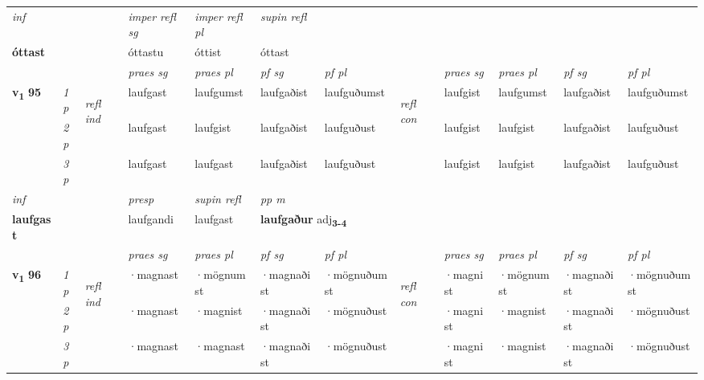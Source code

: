 \begin{longtable}[l]{X>{\footnotesize\itshape}llXXXXlXXXX}
   {\textit{inf}} & &   & \textit{imper refl sg} & \textit{imper refl pl}   & \textit{supin refl}  \\*
  {\textbf{óttast}} & &   & óttastu & óttist   & óttast  \\*

\midrule

 & &   & \textit{praes sg}  & \textit{praes pl}    & \textit{ pf sg} & \textit{pf pl} & & \textit{praes sg}  & \textit{praes pl}    & \textit{pf sg} & \textit{pf pl }  \\ \cmidrule{4-7} \cmidrule{9-12}
 \multirow{2}{*}{{{\textbf{v{\textsubscript{1}}} \Large{\textbf{95}}}}}  & 1p & \multirow{3}{*}{\begin{turn}{90}\textit{refl ind}\end{turn}}  & laufgast & laufgumst & laufgaðist & laufguðumst & \multirow{3}{*}{\begin{turn}{90}\textit{refl con}\end{turn}}  &laufgist & laufgumst & laufgaðist & laufguðumst \\*
 & 2p &  & laufgast & laufgist & laufgaðist & laufguðust & &laufgist & laufgist & laufgaðist & laufguðust \\*
 & 3p  & & laufgast & laufgast & laufgaðist & laufguðust & & laufgist & laufgist& laufgaðist & laufguðust \\*
\cmidrule{4-7} \cmidrule{9-12}

   {\textit{inf}} & &     & \textit{presp}  & \textit{supin refl} & \textit{pp m} \\*
  {\textbf{laufgast}} & &     & laufgandi  & laufgast & \multicolumn{2}{l}{\textbf{laufgaður} adj\textbf{\textsubscript{3-4}}} \\*

\midrule

 & &   & \textit{praes sg}  & \textit{praes pl}    & \textit{ pf sg} & \textit{pf pl} & & \textit{praes sg}  & \textit{praes pl}    & \textit{pf sg} & \textit{pf pl }  \\ \cmidrule{4-7} \cmidrule{9-12}
 \multirow{2}{*}{{{\textbf{v{\textsubscript{1}}} \Large{\textbf{96}}}}}  & 1p & \multirow{3}{*}{\begin{turn}{90}\textit{refl ind}\end{turn}}  & ·magnast & ·mögnumst & ·magnaðist & ·mögnuðumst & \multirow{3}{*}{\begin{turn}{90}\textit{refl con}\end{turn}}  &·magnist & ·mögnumst & ·magnaðist & ·mögnuðumst \\*
 & 2p &  & ·magnast & ·magnist & ·magnaðist & ·mögnuðust & &·magnist & ·magnist & ·magnaðist & ·mögnuðust \\*
 & 3p  & & ·magnast & ·magnast & ·magnaðist & ·mögnuðust & & ·magnist & ·magnist& ·magnaðist & ·mögnuðust \\*
\cmidrule{4-7} \cmidrule{9-12}


\end{longtable}
